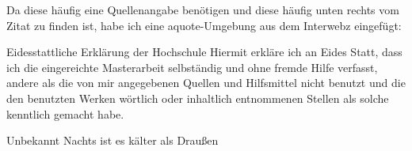 Da diese häufig eine Quellenangabe benötigen und diese häufig unten rechts vom Zitat zu finden ist, habe ich eine aquote-Umgebung aus dem Interwebz eingefügt:

\begin{aquote}{Eidesstattliche Erklärung der Hochschule}
Hiermit erkläre ich an Eides Statt, dass ich die eingereichte Masterarbeit
				selbständig und ohne fremde Hilfe verfasst, andere als die von mir angegebenen Quellen
				und Hilfsmittel nicht benutzt und die den benutzten Werken wörtlich oder
				inhaltlich entnommenen Stellen als solche kenntlich gemacht habe. 
\end{aquote}

\begin{aquote}{Unbekannt}
Nachts ist es kälter als Draußen
\end{aquote}
